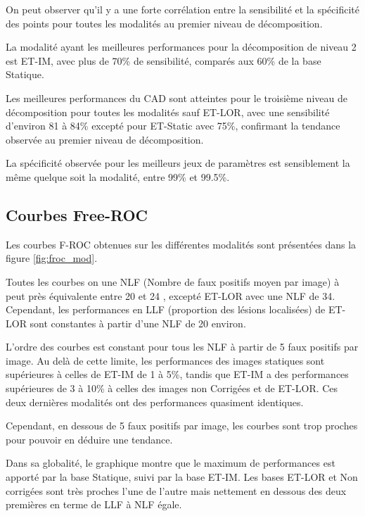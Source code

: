 On peut observer qu'il y a une forte corrélation entre la sensibilité et la spécificité des points pour toutes les modalités au premier niveau de décomposition.

La modalité ayant les meilleures performances pour la décomposition de niveau 2 est ET-IM, avec plus de 70\% de sensibilité, comparés aux 60\% de la base Statique. 

Les meilleures performances du CAD sont atteintes pour le troisième niveau de décomposition pour toutes les modalités sauf ET-LOR, avec une sensibilité d'environ 81 à 84\% excepté pour ET-Static avec 75\%, confirmant la tendance observée au premier niveau de décomposition.

La spécificité observée pour les meilleurs jeux de paramètres est sensiblement la même quelque soit la modalité, entre 99\% et 99.5\%.

\subsection{Courbes Free-ROC}

Les courbes F-ROC obtenues sur les différentes modalités sont présentées dans la figure \ref{fig:froc_mod}. 

Toutes les courbes on une NLF (Nombre de faux positifs moyen par image) à peut près équivalente entre 20 et 24 , excepté ET-LOR avec une NLF de 34. Cependant, les performances en LLF (proportion des lésions localisées) de ET-LOR sont constantes à partir d'une NLF de 20 environ. 

L'ordre des courbes est constant pour tous les NLF à partir de 5 faux positifs par image. Au delà de cette limite, les performances des images statiques sont supérieures à celles de ET-IM de 1 à 5\%, tandis que ET-IM a des performances supérieures de 3 à 10\% à celles des images non Corrigées et de ET-LOR. Ces deux dernières modalités ont des performances quasiment identiques.

Cependant, en dessous de 5 faux positifs par image, les courbes sont trop proches pour pouvoir en déduire une tendance.


Dans sa globalité, le graphique montre que le maximum de performances est apporté par la base Statique, suivi par la base ET-IM. Les bases ET-LOR et Non corrigées sont très proches l'une de l'autre mais nettement en dessous des deux premières en terme de LLF à NLF égale.

